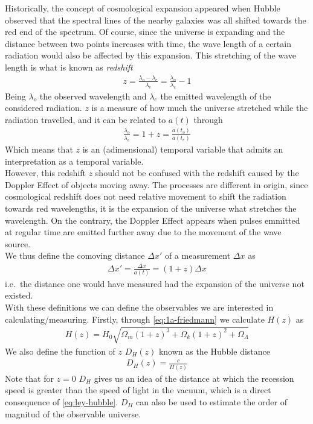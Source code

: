 Historically, the concept of cosmological expansion appeared when Hubble observed that the spectral lines of the nearby galaxies was all shifted towards the red end of the spectrum. Of course, since the universe is expanding and the distance between two points increases with time, the wave length of a certain radiation would also be affected by this expansion. This stretching of the wave length is what is known as \textit{redshift} 
\begin{align}
	z = \frac{\lambda_{\text{o}} - \lambda_{\text{e}}}{\lambda_{\text{e}}} = \frac{\lambda_o}{\lambda_e} - 1
	\label{eq:redshift}
\end{align}
Being $\lambda_o$ the observed wavelength and $\lambda_e$ the emitted wavelength of the considered radiation. $z$ is a measure of how much the universe stretched while the radiation travelled, and it can be related to $a(t)$ through 
\begin{align}
	\frac{\lambda_o}{\lambda_e} = 1+z = \frac{a(t_o)}{a(t_e)}
\end{align}
Which means that $z$ is an (adimensional) temporal variable that admits an interpretation as a temporal variable. \\

However, this redshift $z$ should not be confused with the redshift caused by the Doppler Effect of objects moving away. The processes are different in origin, since cosmological redshift does not need relative movement to shift the radiation towards red wavelengths, it is the expansion of the universe what stretches the wavelength. On the contrary, the Doppler Effect appears when pulses emmitted at regular time are emitted further away due to the movement of the wave source. \\

We thus define the comoving distance $\Delta x'$ of a measurement $\Delta x$ as 
\begin{align}
	\Delta x' =\frac{\Delta x}{a(t)}= (1+z)\Delta x
\end{align}
i.e.\ the distance one would have measured had the expansion of the universe not existed. \\

With these definitions we can define  the observables we are interested in calculating/measuring. Firstly, through \eqref{eq:1a-friedmann} we calculate $H(z)$ as  
\begin{align}
	H(z) = H_0 \sqrt{\Omega_m(1+z)^3 + \Omega_k(1+z)^2 + \Omega_\Lambda} 
\end{align}
We also define the function of $z$ $D_H(z)$ known as the Hubble distance
\begin{align}
	D_H(z)  = \frac{c}{H(z)}
	\label{eq:DH-definition}
\end{align}
Note that for $z = 0$ $D_H$ gives us an idea of the distance at which the recession speed is greater than the speed of light in the vacuum, which is a direct consequence of \eqref{eq:ley-hubble}. $D_H$ can also be used to estimate the order of magnitud of the observable universe. \\

